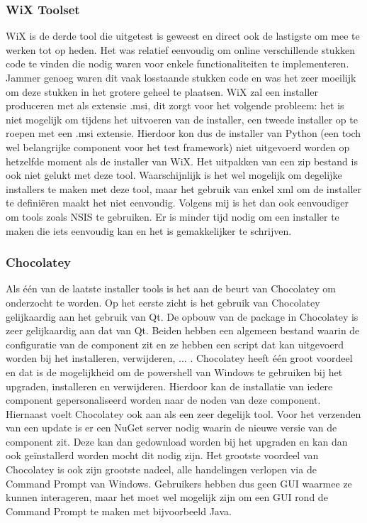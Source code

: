 \documentclass{article}
\begin{document}
\subsubsection{WiX Toolset}
WiX is de derde tool die uitgetest is geweest en direct ook de lastigste om mee te werken tot op heden.
Het was relatief eenvoudig om online verschillende stukken code te vinden die nodig waren voor enkele functionaliteiten te implementeren.
Jammer genoeg waren dit vaak losstaande stukken code en was het zeer moeilijk om deze stukken in het grotere geheel te plaatsen.
WiX zal een installer produceren met als extensie .msi, dit zorgt voor het volgende probleem: het is niet mogelijk om tijdens het uitvoeren van de installer, een tweede installer op te roepen met een .msi extensie.
Hierdoor kon dus de installer van Python (een toch wel belangrijke component voor het test framework) niet uitgevoerd worden op hetzelfde moment als de installer van WiX.
Het uitpakken van een zip bestand is ook niet gelukt met deze tool.
Waarschijnlijk is het wel mogelijk om degelijke installers te maken met deze tool, maar het gebruik van enkel xml om de installer te defini\"eren maakt het niet eenvoudig.
Volgens mij is het dan ook eenvoudiger om tools zoals NSIS te gebruiken.
Er is minder tijd nodig om een installer te maken die iets eenvoudig kan en het is gemakkelijker te schrijven.

\subsubsection{Chocolatey}
Als \'e\'en van de laatste installer tools is het aan de beurt van Chocolatey om onderzocht te worden.
Op het eerste zicht is het gebruik van Chocolatey gelijkaardig aan het gebruik van Qt.
De opbouw van de package in Chocolatey is zeer gelijkaardig aan dat van Qt.
Beiden hebben een algemeen bestand waarin de configuratie van de component zit en ze hebben een script dat kan uitgevoerd worden bij het installeren, verwijderen, ... .
Chocolatey heeft \'e\'en groot voordeel en dat is de mogelijkheid om de powershell van Windows te gebruiken bij het upgraden, installeren en verwijderen.
Hierdoor kan de installatie van iedere component gepersonaliseerd worden naar de noden van deze component.
Hiernaast voelt Chocolatey ook aan als een zeer degelijk tool.
Voor het verzenden van een update is er een NuGet server nodig waarin de nieuwe versie van de component zit.
Deze kan dan gedownload worden bij het upgraden en kan dan ook ge\"installerd worden mocht dit nodig zijn.
Het grootste voordeel van Chocolatey is ook zijn grootste nadeel, alle handelingen verlopen via de Command Prompt van Windows.
Gebruikers hebben dus geen GUI waarmee ze kunnen interageren, maar het moet wel mogelijk zijn om een GUI rond de Command Prompt te maken met bijvoorbeeld Java.
\end{document}
